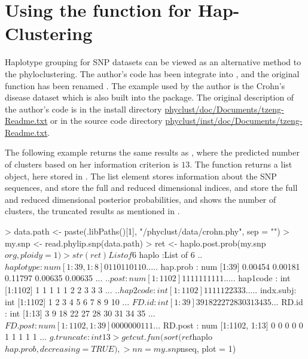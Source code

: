 \section[Using the haplo.post.prob() function for Hap-Clustering]{Using the  function for Hap-Clustering}
\label{sec:haplo}

Haplotype grouping \citep{tzeng2005} for SNP datasets
can be viewed as an alternative method to the phyloclustering.
The author's  code has been integrate into ,
and the original function has been renamed .
The example used by the author is the Crohn's disease dataset
\citep{Hugot2001} which is also built into the  package.
The original description of the author's  code is in the
install directory 
\url{phyclust/doc/Documents/tzeng-Readme.txt} or in the source code directory
\url{phyclust/inst/doc/Documents/tzeng-Readme.txt}.

The following example returns the same results as \cite{tzeng2005}, where
the predicted number of clusters based on her information criterion is $13$.
The function returns a list object, here stored in .
The list element  stores information about the SNP sequences,
 and  store the full and reduced dimensional
indices, 
 and  store the full and reduced dimensional
posterior probabilities, and  shows
the number of clusters,
the truncated results as mentioned in \cite{tzeng2005}.
\begin{Code}
> data.path <- paste(.libPaths()[1], "/phyclust/data/crohn.phy", sep = "")
> my.snp <- read.phylip.snp(data.path)
> ret <- haplo.post.prob(my.snp$org, ploidy = 1)
> str(ret)
List of 6
 $ haplo     :List of 6
  ..$ haplotype: num [1:39, 1:8] 0 1 1 0 1 1 0 1 1 0 ...
  ..$ hap.prob : num [1:39] 0.00454 0.00181 0.11797 0.00635 0.00635 ...
  ..$ post     : num [1:1102] 1 1 1 1 1 1 1 1 1 1 ...
  ..$ hap1code : int [1:1102] 1 1 1 1 1 2 2 3 3 3 ...
  ..$ hap2code : int [1:1102] 1 1 1 1 1 2 2 3 3 3 ...
  ..$ indx.subj: int [1:1102] 1 2 3 4 5 6 7 8 9 10 ...
 $ FD.id     : int [1:39] 3 9 18 22 27 28 30 31 34 35 ...
 $ RD.id     : int [1:13] 3 9 18 22 27 28 30 31 34 35 ...
 $ FD.post   : num [1:1102, 1:39] 0 0 0 0 0 0 0 1 1 1 ...
 $ RD.post   : num [1:1102, 1:13] 0 0 0 0 0 1 1 1 1 1 ...
 $ g.truncate: int 13
> getcut.fun(sort(ret$haplo$hap.prob, decreasing = TRUE),
>            nn = my.snp$nseq, plot = 1)
\end{Code}

